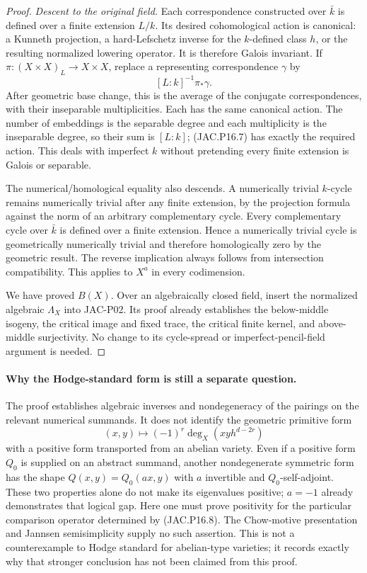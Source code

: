 \documentclass[11pt,a4paper]{article}
\begin{document}
\begin{proof}
\emph{Descent to the original field.}
Each correspondence constructed over $\bar k$ is defined over a
finite extension $L/k$. Its desired cohomological action is
canonical: a Kunneth projection, a hard-Lefschetz inverse for
the $k$-defined class $h$, or the resulting normalized lowering
operator. It is therefore Galois invariant. If
$\pi:(X\times X)_L\to X\times X$, replace a representing
correspondence $\gamma$ by
\[
                         [L:k]^{-1}\pi_*\gamma.          \tag{JAC.P16.7}
\]
After geometric base change, this is the average of the conjugate
correspondences, with their inseparable multiplicities. Each has
the same canonical action. The number of embeddings is the
separable degree and each multiplicity is the inseparable degree,
so their sum is $[L:k]$; (JAC.P16.7) has exactly the required
action. This deals with imperfect $k$ without pretending every
finite extension is Galois or separable.

The numerical/homological equality also descends. A numerically
trivial $k$-cycle remains numerically trivial after any finite
extension, by the projection formula against the norm of an
arbitrary complementary cycle. Every complementary cycle over
$\bar k$ is defined over a finite extension. Hence a numerically
trivial cycle is geometrically numerically trivial and therefore
homologically zero by the geometric result. The reverse implication
always follows from intersection compatibility. This applies
to $X^a$ in every codimension.

We have proved $B(X)$. Over an algebraically closed field, insert
the normalized algebraic $\Lambda_X$ into JAC-P02. Its proof
already establishes the below-middle isogeny, the critical image
and fixed trace, the critical finite kernel, and above-middle
surjectivity. No change to its cycle-spread or imperfect-pencil-field
argument is needed.
\end{proof}

\paragraph{Why the Hodge-standard form is still a separate question.}
The proof establishes algebraic inverses and nondegeneracy of the
pairings on the relevant numerical summands. It does not identify
the geometric primitive form
\[
       (x,y)\longmapsto(-1)^r\deg_X(xyh^{d-2r})           \tag{JAC.P16.8}
\]
with a positive form transported from an abelian variety. Even
if a positive form $Q_0$ is supplied on an abstract summand,
another nondegenerate symmetric form has the shape
$Q(x,y)=Q_0(ax,y)$ with $a$ invertible and $Q_0$-self-adjoint.
These two properties alone do not make its eigenvalues positive;
$a=-1$ already demonstrates that logical gap. Here one must prove
positivity for the particular comparison operator determined by
(JAC.P16.8). The Chow-motive presentation and Jannsen
semisimplicity supply no such assertion. This is not a
counterexample to Hodge standard for abelian-type varieties;
it records exactly why that stronger conclusion has not been
claimed from this proof.
\end{document}
